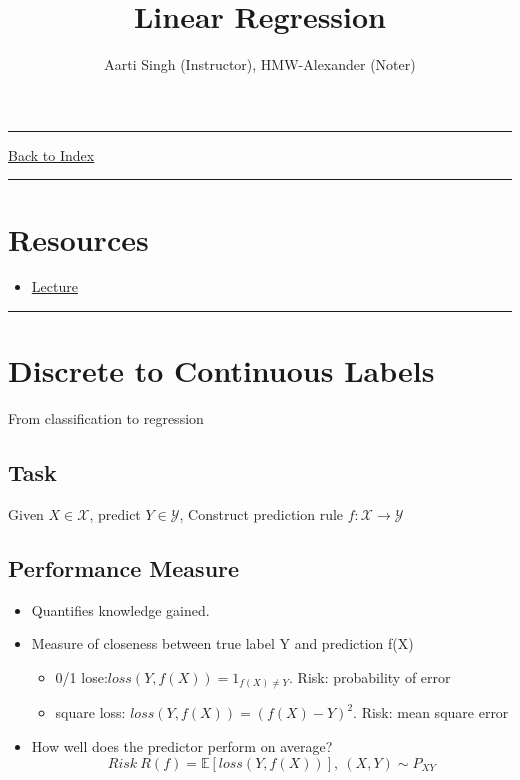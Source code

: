 \documentclass[letterpaper,10pt]{article}
\title{\textbf{Linear Regression}}
\author{Aarti Singh (Instructor), HMW-Alexander (Noter)}
\newcommand{\panhline}{\begin{center}\rule{\textwidth}{1pt}\end{center}}
\begin{document}
\maketitle

\panhline
\href{../index.html}{Back to Index}

\panhline
\tableofcontents

\section*{Resources}

\begin{itemize}
	\item \href{../../Lectures/04_LinearRegression.pdf}{Lecture}
\end{itemize}

\panhline

\section{Discrete to Continuous Labels}
	
From classification to regression

\subsection{Task}

Given $X\in \mathcal{X}$, predict $Y \in \mathcal{Y}$, Construct prediction rule $f:\mathcal{X} \rightarrow \mathcal{Y}$

\subsection{Performance Measure}

\begin{itemize}
	\item Quantifies knowledge gained.
	\item Measure of closeness between true label Y and prediction f(X)
	\begin{itemize}
		\item 0/1 lose:$loss(Y,f(X))=1_{f(X)\neq Y}$. Risk: probability of error 
		\item square loss: $loss(Y,f(X))=(f(X)-Y)^2$. Risk: mean square error
	\end{itemize}
	\item How well does the predictor perform on average?
	$$Risk~R(f)=\mathbb{E}[loss(Y,f(X))],~(X,Y)\sim P_{XY}$$
\end{itemize}
\end{document}
